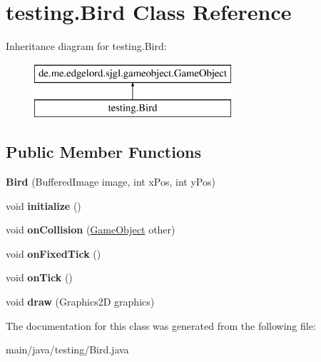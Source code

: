 \hypertarget{classtesting_1_1_bird}{}\section{testing.\+Bird Class Reference}
\label{classtesting_1_1_bird}
Inheritance diagram for testing.\+Bird\+:\begin{figure}[H]
\begin{center}
\leavevmode
\includegraphics[height=2.000000cm]{classtesting_1_1_bird}
\end{center}
\end{figure}
\subsection*{Public Member Functions}
\begin{DoxyCompactItemize}
\item 
\mbox{\label{classtesting_1_1_bird_a87dd86c890fb1115078f9f94883a613a}} 
{\bfseries Bird} (Buffered\+Image image, int x\+Pos, int y\+Pos)
\item 
\mbox{\label{classtesting_1_1_bird_af9cf7b8ea19b4a8b08d2f5a999fc02f8}} 
void {\bfseries initialize} ()
\item 
\mbox{\label{classtesting_1_1_bird_a51932f470451880d3315c5adcfe9992c}} 
void {\bfseries on\+Collision} (\mbox{\hyperlink{classde_1_1me_1_1edgelord_1_1sjgl_1_1gameobject_1_1_game_object}{Game\+Object}} other)
\item 
\mbox{\label{classtesting_1_1_bird_a274216914f2a7a2a789176e58a003ea2}} 
void {\bfseries on\+Fixed\+Tick} ()
\item 
\mbox{\label{classtesting_1_1_bird_ad89aa00a1277d83302922cde91a0e7fd}} 
void {\bfseries on\+Tick} ()
\item 
\mbox{\label{classtesting_1_1_bird_ae0a9ed5dc2ee4024c9333d7f2c1f6727}} 
void {\bfseries draw} (Graphics2D graphics)
\end{DoxyCompactItemize}


The documentation for this class was generated from the following file\+:\begin{DoxyCompactItemize}
\item 
main/java/testing/Bird.\+java\end{DoxyCompactItemize}
